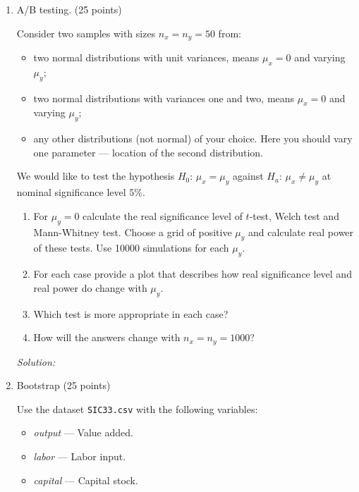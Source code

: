 \documentclass[12pt]{article}
\newcommand{\1}{\mathbbm{I}}
\begin{document}
	

\begin{enumerate}


\item  A/B testing. (25 points)

Consider two samples with sizes $n_x = n_y=50$ from:
\begin{itemize}
	\item two normal distributions with unit variances, means $\mu_x = 0$ and varying $\mu_y$;
	\item two normal distributions with variances one and two, means $\mu_x = 0$ and varying $\mu_y$;
	\item any other distributions (not normal) of your choice. 
	Here you should vary one parameter — location of the second distribution.
\end{itemize}

We would like to test the hypothesis $H_0$: $\mu_x = \mu_y$ against $H_a$: $\mu_x \neq \mu_y$ at nominal significance level $5\%$.
\begin{enumerate}
	\item For $\mu_y =0$ calculate the real significance level of $t$-test, Welch test and Mann-Whitney test. 
	Choose a grid of positive $\mu_y$ and calculate real power of these tests. Use 10000 simulations for each $\mu_y$.  
	\item For each case provide a plot that describes how 
	real significance level and real power do change with $\mu_y$.
	\item Which test is more appropriate in each case?
	\item How will the answers change with $n_x = n_y =1000$?
	
\end{enumerate}

\begin{teacher}
	
\textit{Solution:} 

	
\end{teacher}





\item Bootstrap (25 points)


Use the dataset \texttt{SIC33.csv} with the following variables:
\begin{itemize}
	\item \textit{output} — Value added.
	\item  \textit{labor} — Labor input.
	\item  \textit{capital} — Capital stock.
\end{itemize}


\end{enumerate}
\end{document}
